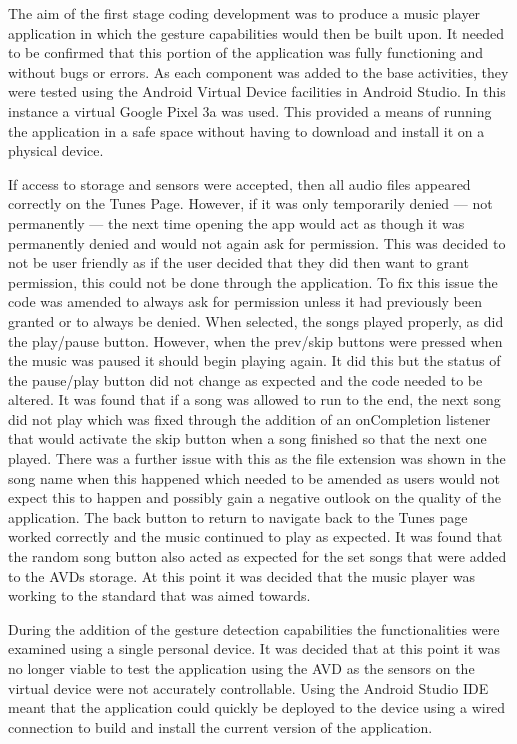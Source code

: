 \documentclass{l4proj}
\begin{document}
The aim of the first stage coding development was to produce a music player application in which the gesture capabilities would then be built upon. It needed to be confirmed that this portion of the application was fully functioning and without bugs or errors. As each component was added to the base activities, they were tested using the Android Virtual Device facilities in Android Studio. In this instance a virtual Google Pixel 3a was used. This provided a means of running the application in a safe space without having to download and install it on a physical device. 

If access to storage and sensors were accepted, then all audio files appeared correctly on the Tunes Page. However, if it was only temporarily denied --- not permanently --- the next time opening the app would act as though it was permanently denied and would not again ask for permission. This was decided to not be user friendly as if the user decided that they did then want to grant permission, this could not be done through the application. To fix this issue the code was amended to always ask for permission unless it had previously been granted or to always be denied. When selected, the songs played properly, as did the play/pause button. However, when the prev/skip buttons were pressed when the music was paused it should begin playing again. It did this but the status of the pause/play button did not change as expected and the code needed to be altered. It was found that if a song was allowed to run to the end, the next song did not play which was fixed through the addition of an onCompletion listener that would activate the skip button when a song finished so that the next one played. There was a further issue with this as the file extension was shown in the song name when this happened which needed to be amended as users would not expect this to happen and possibly gain a negative outlook on the quality of the application. The back button to return to navigate back to the Tunes page worked correctly and the music continued to play as expected. It was found that the random song button also acted as expected for the set songs that were added to the AVDs storage. At this point it was decided that the music player was working to the standard that was aimed towards.


During the addition of the gesture detection capabilities the functionalities were examined using a single personal device. It was decided that at this point it was no longer viable to test the application using the AVD as the sensors on the virtual device were not accurately controllable. Using the Android Studio IDE meant that the application could quickly be deployed to the device using a wired connection to build and install the current version of the application.
\end{document}
